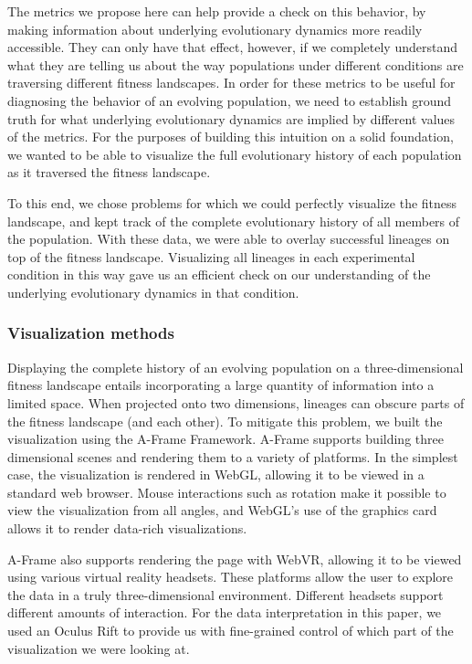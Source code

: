 \documentclass[letterpaper]{article}
\begin{document}
The metrics we propose here can help provide a check on this behavior, by making information about underlying evolutionary dynamics more readily accessible. They can only have that effect, however, if we completely understand what they are telling us about the way populations under different conditions are traversing different fitness landscapes. In order for these metrics to be useful for diagnosing the behavior of an evolving population, we need to establish ground truth for what underlying evolutionary dynamics are implied by different values of the metrics. For the purposes of building this intuition on a solid foundation, we wanted to be able to visualize the full evolutionary history of each population as it traversed the fitness landscape.

To this end, we chose problems for which we could perfectly visualize the fitness landscape, and kept track of the complete evolutionary history of all members of the population. With these data, we were able to overlay successful lineages on top of the fitness landscape. Visualizing all lineages in each experimental condition in this way gave us an efficient check on our understanding of the underlying evolutionary dynamics in that condition. 

\subsubsection{Visualization methods}

Displaying the complete history of an evolving population on a three-dimensional fitness landscape entails incorporating a large quantity of information into a limited space. When projected onto two dimensions, lineages can obscure parts of the fitness landscape (and each other). To mitigate this problem, we built the visualization using the A-Frame Framework. A-Frame supports building three dimensional scenes and rendering them to a variety of platforms. In the simplest case, the visualization is rendered in WebGL, allowing it to be viewed in a standard web browser. Mouse interactions such as rotation make it possible to view the visualization from all angles, and WebGL's use of the graphics card allows it to render data-rich visualizations. 

A-Frame also supports rendering the page with WebVR, allowing it to be viewed using various virtual reality headsets. These platforms allow the user to explore the data in a truly three-dimensional environment. Different headsets support different amounts of interaction. For the data interpretation in this paper, we used an Oculus Rift to provide us with fine-grained control of which part of the visualization we were looking at.
\end{document}
